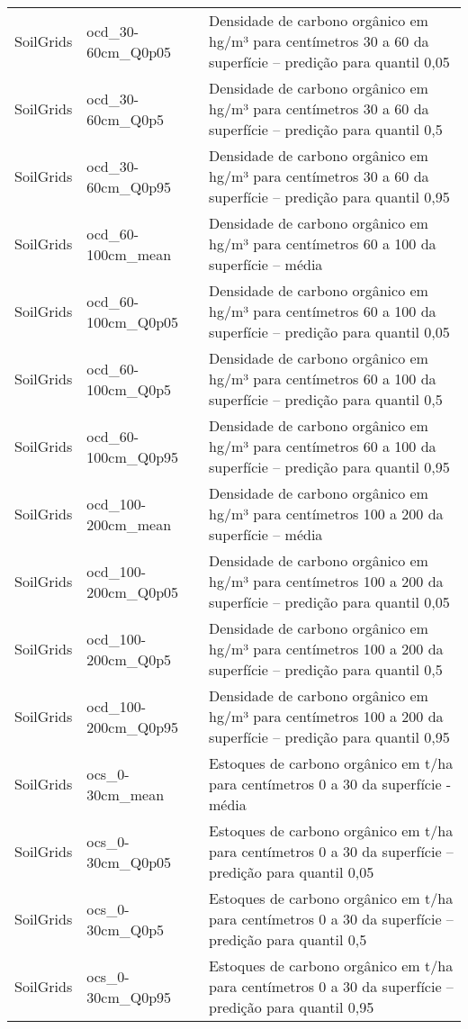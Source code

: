 \begin{longtable}{@{} p{4cm} p{4cm} p{8cm} @{}}
	SoilGrids &
	ocd\_30-60cm\_Q0p05 &
	Densidade de carbono orgânico em hg/m³ para centímetros 30 a 60 da superfície – predição para quantil 0,05 \\
	SoilGrids &
	ocd\_30-60cm\_Q0p5 &
	Densidade de carbono orgânico em hg/m³ para centímetros 30 a 60 da superfície – predição para quantil 0,5 \\
	SoilGrids &
	ocd\_30-60cm\_Q0p95 &
	Densidade de carbono orgânico em hg/m³ para centímetros 30 a 60 da superfície – predição para quantil 0,95 \\
	SoilGrids &
	ocd\_60-100cm\_mean &
	Densidade de carbono orgânico em hg/m³ para centímetros 60 a 100 da superfície – média \\
	SoilGrids &
	ocd\_60-100cm\_Q0p05 &
	Densidade de carbono orgânico em hg/m³ para centímetros 60 a 100 da superfície – predição para quantil 0,05 \\
	SoilGrids &
	ocd\_60-100cm\_Q0p5 &
	Densidade de carbono orgânico em hg/m³ para centímetros 60 a 100 da superfície – predição para quantil 0,5 \\
	SoilGrids &
	ocd\_60-100cm\_Q0p95 &
	Densidade de carbono orgânico em hg/m³ para centímetros 60 a 100 da superfície – predição para quantil 0,95 \\
	SoilGrids &
	ocd\_100-200cm\_mean &
	Densidade de carbono orgânico em hg/m³ para centímetros 100 a 200 da superfície – média \\
	SoilGrids &
	ocd\_100-200cm\_Q0p05 &
	Densidade de carbono orgânico em hg/m³ para centímetros 100 a 200 da superfície – predição para quantil 0,05 \\
	SoilGrids &
	ocd\_100-200cm\_Q0p5 &
	Densidade de carbono orgânico em hg/m³ para centímetros 100 a 200 da superfície – predição para quantil 0,5 \\
	SoilGrids &
	ocd\_100-200cm\_Q0p95 &
	Densidade de carbono orgânico em hg/m³ para centímetros 100 a 200 da superfície – predição para quantil 0,95 \\
	SoilGrids &
	ocs\_0-30cm\_mean &
	Estoques de carbono orgânico em t/ha para centímetros 0 a 30 da superfície - média \\
	SoilGrids &
	ocs\_0-30cm\_Q0p05 &
	Estoques de carbono orgânico em t/ha para centímetros 0 a 30 da superfície – predição para quantil 0,05 \\
	SoilGrids &
	ocs\_0-30cm\_Q0p5 &
	Estoques de carbono orgânico em t/ha para centímetros 0 a 30 da superfície – predição para quantil 0,5 \\
	SoilGrids &
	ocs\_0-30cm\_Q0p95 &
	Estoques de carbono orgânico em t/ha para centímetros 0 a 30 da superfície – predição para quantil 0,95 \\

\end{longtable}
